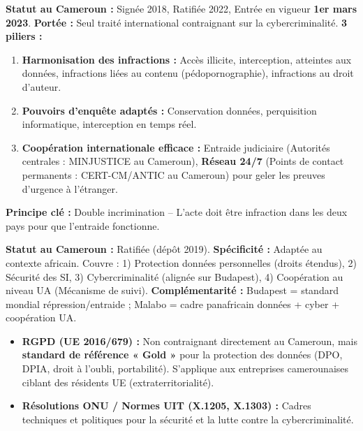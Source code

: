 \documentclass[11pt]{article}
\newcommand{\cle}[1]{{\popxbold\color{popdark}#1}}
\begin{document}
\begin{definition}
    \textbf{Statut au Cameroun :} Signée 2018, Ratifiée 2022, Entrée en vigueur \textbf{1er mars 2023}.
    \textbf{Portée :} \cle{Seul traité international contraignant} sur la cybercriminalité.
    \textbf{3 piliers :}
    \begin{enumerate}
        \item \textbf{Harmonisation des infractions :} Accès illicite, interception, atteintes aux données, infractions liées au contenu (pédopornographie), infractions au droit d'auteur.
        \item \textbf{Pouvoirs d'enquête adaptés :} Conservation données, perquisition informatique, interception en temps réel.
        \item \textbf{Coopération internationale efficace :} Entraide judiciaire (Autorités centrales : MINJUSTICE au Cameroun), \textbf{Réseau 24/7} (Points de contact permanents : CERT-CM/ANTIC au Cameroun) pour geler les preuves d'urgence à l'étranger.
    \end{enumerate}
    \textbf{Principe clé :} \cle{Double incrimination} -- L'acte doit être infraction dans les deux pays pour que l'entraide fonctionne.
\end{definition}

\begin{definition}
    \textbf{Statut au Cameroun :} Ratifiée (dépôt 2019).
    \textbf{Spécificité :} Adaptée au contexte africain. Couvre : 1) Protection données personnelles (droits étendus), 2) Sécurité des SI, 3) Cybercriminalité (alignée sur Budapest), 4) Coopération au niveau UA (Mécanisme de suivi).
    \textbf{Complémentarité :} Budapest = standard mondial répression/entraide ; Malabo = cadre panafricain données + cyber + coopération UA.
\end{definition}

\begin{aretenir}
    \begin{itemize}
        \item \textbf{RGPD (UE 2016/679) :} Non contraignant directement au Cameroun, mais \textbf{standard de référence « Gold »} pour la protection des données (DPO, DPIA, droit à l'oubli, portabilité). S'applique aux entreprises camerounaises ciblant des résidents UE (extraterritorialité).
        \item \textbf{Résolutions ONU / Normes UIT (X.1205, X.1303) :} Cadres techniques et politiques pour la sécurité et la lutte contre la cybercriminalité.
    \end{itemize}
\end{aretenir}
\end{document}
